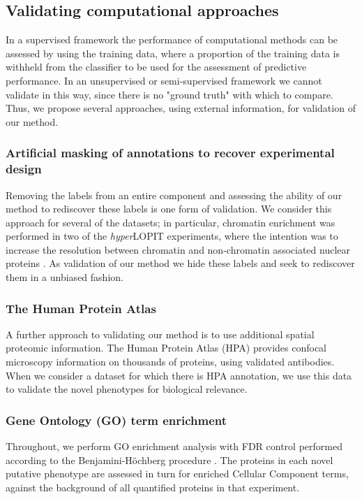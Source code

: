 \documentclass[12pt,english]{article}
\begin{document}
\subsection{Validating computational approaches}
In a supervised framework the performance of computational methods can be assessed by 
using the training data, where a proportion of the training data is withheld from the classifier to be used for the assessment of predictive performance. In an unsupervised or semi-supervised framework we cannot validate in this way, since there is no "ground truth" with which to compare. Thus, we propose several approaches, using external information, for validation of our method.
\subsubsection{Artificial masking of annotations to recover experimental design}
Removing the labels from an entire component and assessing the ability of our method to rediscover these labels is one form of validation. We consider this approach for several of the datasets; in particular, chromatin enrichment was performed in two of the \textit{hyper}LOPIT experiments, where the intention was to increase the resolution between chromatin and non-chromatin associated nuclear proteins \citep{hyper, Mulvey:2017, Thul:2017}. As validation of our method we hide these labels and seek to rediscover them in a unbiased fashion.
\subsubsection{The Human Protein Atlas}
A further approach to validating our method is to use additional spatial proteomic information. The Human Protein Atlas (HPA) \citep{Thul:2017, Sullivan:2018} provides confocal microscopy information on thousands of proteins, using validated antibodies. When we consider a dataset for which there is HPA annotation, we use this data to validate the novel phenotypes for biological relevance. 
\subsubsection{Gene Ontology (GO) term enrichment}
Throughout, we perform GO enrichment analysis with FDR control performed according to the Benjamini-H\"ochberg procedure \citep{FDR:1995,Ashburner:2000,Yu:2012}. The proteins in each novel putative phenotype are assessed in turn for enriched Cellular Component terms, against the background of all quantified proteins in that experiment.
\end{document}
